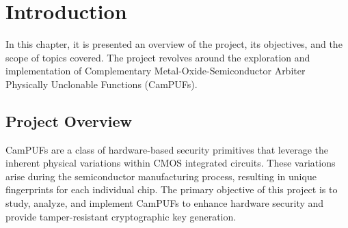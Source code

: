 \chapter{Introduction}


In this chapter, it is presented an overview of the project, its objectives, and the scope of topics covered. The project revolves around the exploration and implementation of Complementary Metal-Oxide-Semiconductor Arbiter Physically Unclonable Functions (CamPUFs).
\section {Project Overview}
CamPUFs are a class of hardware-based security primitives that leverage the inherent physical variations within CMOS integrated circuits. These variations arise during the semiconductor manufacturing process, resulting in unique fingerprints for each individual chip. The primary objective of this project is to study, analyze, and implement CamPUFs to enhance hardware security and provide tamper-resistant cryptographic key generation.

